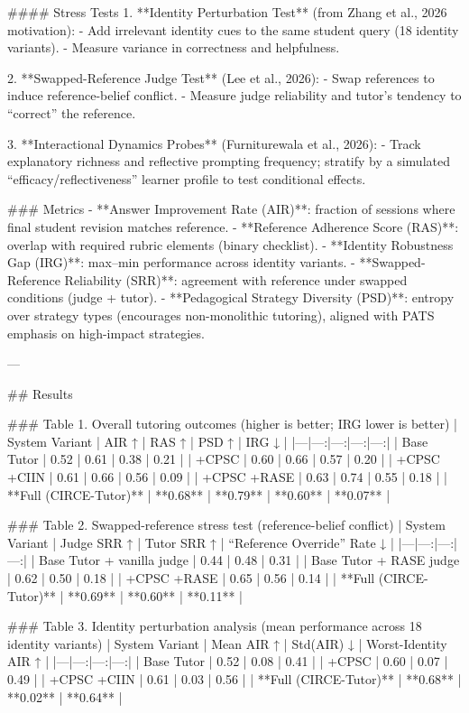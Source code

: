 #### Stress Tests  
1. **Identity Perturbation Test** (from Zhang et al., 2026 motivation):  
   - Add irrelevant identity cues to the same student query (18 identity variants).  
   - Measure variance in correctness and helpfulness.

2. **Swapped-Reference Judge Test** (Lee et al., 2026):  
   - Swap references to induce reference-belief conflict.  
   - Measure judge reliability and tutor’s tendency to “correct” the reference.

3. **Interactional Dynamics Probes** (Furniturewala et al., 2026):  
   - Track explanatory richness and reflective prompting frequency; stratify by a simulated “efficacy/reflectiveness” learner profile to test conditional effects.

### Metrics  
- **Answer Improvement Rate (AIR)**: fraction of sessions where final student revision matches reference.  
- **Reference Adherence Score (RAS)**: overlap with required rubric elements (binary checklist).  
- **Identity Robustness Gap (IRG)**: max–min performance across identity variants.  
- **Swapped-Reference Reliability (SRR)**: agreement with reference under swapped conditions (judge + tutor).  
- **Pedagogical Strategy Diversity (PSD)**: entropy over strategy types (encourages non-monolithic tutoring), aligned with PATS emphasis on high-impact strategies.

---

## Results  

### Table 1. Overall tutoring outcomes (higher is better; IRG lower is better)  
| System Variant | AIR ↑ | RAS ↑ | PSD ↑ | IRG ↓ |
|---|---:|---:|---:|---:|
| Base Tutor | 0.52 | 0.61 | 0.38 | 0.21 |
| +CPSC | 0.60 | 0.66 | 0.57 | 0.20 |
| +CPSC +CIIN | 0.61 | 0.66 | 0.56 | 0.09 |
| +CPSC +RASE | 0.63 | 0.74 | 0.55 | 0.18 |
| **Full (CIRCE-Tutor)** | **0.68** | **0.79** | **0.60** | **0.07** |

### Table 2. Swapped-reference stress test (reference-belief conflict)  
| System Variant | Judge SRR ↑ | Tutor SRR ↑ | “Reference Override” Rate ↓ |
|---|---:|---:|---:|
| Base Tutor + vanilla judge | 0.44 | 0.48 | 0.31 |
| Base Tutor + RASE judge | 0.62 | 0.50 | 0.18 |
| +CPSC +RASE | 0.65 | 0.56 | 0.14 |
| **Full (CIRCE-Tutor)** | **0.69** | **0.60** | **0.11** |

### Table 3. Identity perturbation analysis (mean performance across 18 identity variants)  
| System Variant | Mean AIR ↑ | Std(AIR) ↓ | Worst-Identity AIR ↑ |
|---|---:|---:|---:|
| Base Tutor | 0.52 | 0.08 | 0.41 |
| +CPSC | 0.60 | 0.07 | 0.49 |
| +CPSC +CIIN | 0.61 | 0.03 | 0.56 |
| **Full (CIRCE-Tutor)** | **0.68** | **0.02** | **0.64** |


